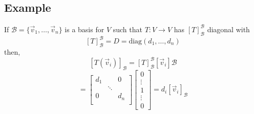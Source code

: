 \documentclass[a4paper,10pt]{article}
\begin{document}
\subsection{Example}
If $\mathcal{B} = \{ \vec{v}_1, \ldots, \vec{v}_n \}$ is a basis for $V$ such 
that $T: V \to V$ has $[T]_\mathcal{B}^\mathcal{B}$ diagonal with
$$[T]_\mathcal{B}^\mathcal{B} = D = \text{diag}(d_1, \ldots, d_n)$$
then,
$$[T(\vec{v}_i)]_\mathcal{B} = [T]_\mathcal{B}^\mathcal{B} [\vec{v}_i]\mathcal{B}$$
$$=
\begin{bmatrix} 
d_1	&	& 0\\
	&	\ddots & \\
0	&	&	d_n\\
\end{bmatrix} 
\begin{bmatrix} 
0 \\
\vdots \\
1\\
\vdots\\
0
\end{bmatrix} 
=
d_i[\vec{v}_i]_\mathcal{B}
$$
\end{document}
